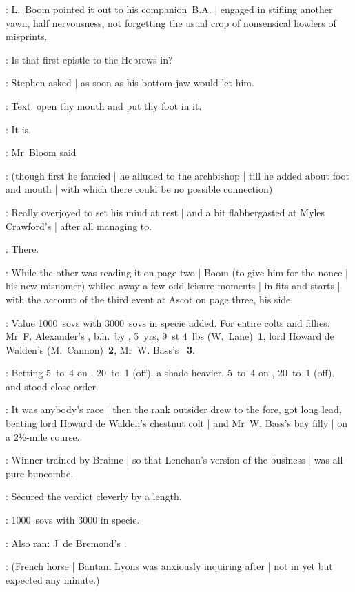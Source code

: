 :
L.~Boom pointed it out to his companion~B.A. |
engaged in stifling another yawn,
half nervousness,
not forgetting the usual crop of nonsensical howlers of misprints.

\Stephen:
Is that first epistle to the Hebrews in?

:
Stephen asked |
as soon as his bottom jaw would let him.

\Stephen:
Text: open thy mouth and put thy foot in it.

\Bloom:
It is.

:
Mr~Bloom said%

:
(though first he fancied |
he alluded to the archbishop |
till he added about foot and mouth |
with which there could be no possible connection)

:
Really overjoyed to set his mind at rest |
and a bit flabbergasted at Myles Crawford's |
after all managing to.

\Bloom:
There.

:
While the other was reading it on page two |
Boom
(to give him for the nonce |
his new misnomer)
whiled away a few odd leisure moments |
in fits and starts |
with the account of the third event at Ascot on page three,
his side.

:
Value 1000~sovs with 3000~sovs in specie added.
For entire colts and fillies.
Mr~F. Alexander's ,
b.h.~by ,
5~yrs, 9~st 4~lbs (W.~Lane)~\textbf{1},
lord Howard de Walden's  (M.~Cannon)~\textbf{2},
Mr~W. Bass's ~\textbf{3}.%

:
Betting 5~to~4 on ,
20~to~1  (off).
 a shade heavier,
5~to~4 on ,
20~to~1  (off).
 and  stood close order.

:
It was anybody's race |
then the rank outsider drew to the fore,
got long lead,
beating lord Howard de Walden's chestnut colt |
and Mr~W. Bass's bay filly  |
on a 2½-mile course.

:
Winner trained by Braime |
so that Lenehan's version of the business |
was all pure buncombe.

:
Secured the verdict cleverly by a length.

:
1000~sovs with 3000 in specie.

:
Also ran:
J~de Bremond's .

:
(French horse |
Bantam Lyons was anxiously inquiring after |
not in yet but expected any minute.)

